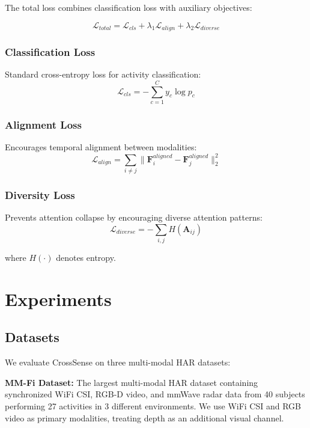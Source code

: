\documentclass[10pt,twocolumn]{article}
\begin{document}
The total loss combines classification loss with auxiliary objectives:

\begin{equation}
\mathcal{L}_{total} = \mathcal{L}_{cls} + \lambda_1 \mathcal{L}_{align} + \lambda_2 \mathcal{L}_{diverse}
\end{equation}

\subsubsection{Classification Loss}
Standard cross-entropy loss for activity classification:
\begin{equation}
\mathcal{L}_{cls} = -\sum_{c=1}^{C} y_c \log p_c
\end{equation}

\subsubsection{Alignment Loss}
Encourages temporal alignment between modalities:
\begin{equation}
\mathcal{L}_{align} = \sum_{i \neq j} \|\mathbf{F}_i^{aligned} - \mathbf{F}_j^{aligned}\|_2^2
\end{equation}

\subsubsection{Diversity Loss}
Prevents attention collapse by encouraging diverse attention patterns:
\begin{equation}
\mathcal{L}_{diverse} = -\sum_{i,j} H(\mathbf{A}_{ij})
\end{equation}

where $H(\cdot)$ denotes entropy.

\section{Experiments}

\subsection{Datasets}

We evaluate CrossSense on three multi-modal HAR datasets:

\textbf{MM-Fi Dataset:} The largest multi-modal HAR dataset containing synchronized WiFi CSI, RGB-D video, and mmWave radar data from 40 subjects performing 27 activities in 3 different environments. We use WiFi CSI and RGB video as primary modalities, treating depth as an additional visual channel.
\end{document}
